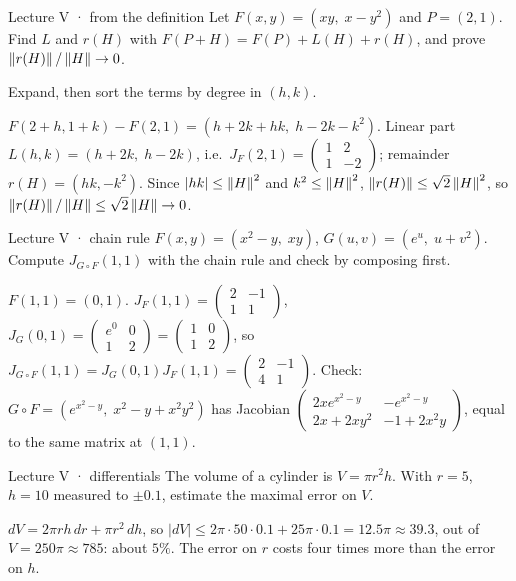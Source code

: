 \begin{problem}{Lecture V · from the definition}
Let $F(x,y)=(xy,\;x-y^2)$ and $P=(2,1)$. Find $L$ and $r(H)$ with $F(P+H)=F(P)+L(H)+r(H)$, and
prove $\left\lVert r(H)\right\rVert/\left\lVert H\right\rVert\to0$.
\end{problem}
\begin{hint}Expand, then sort the terms by degree in $(h,k)$.\end{hint}
\begin{solution}
$F(2+h,1+k)-F(2,1)=(h+2k+hk,\;h-2k-k^2)$. Linear part $L(h,k)=(h+2k,\;h-2k)$, i.e.\
$J_F(2,1)=\begin{pmatrix}1&2\\1&-2\end{pmatrix}$; remainder $r(H)=(hk,-k^2)$. Since $|hk|\le\left\lVert H\right\rVert^2$ and
$k^2\le\left\lVert H\right\rVert^2$, $\left\lVert r(H)\right\rVert\le\sqrt2\left\lVert H\right\rVert^2$, so $\left\lVert r(H)\right\rVert/\left\lVert H\right\rVert\le\sqrt2\left\lVert H\right\rVert\to0$.
\end{solution}

\begin{problem}{Lecture V · chain rule}
$F(x,y)=(x^2-y,\;xy)$, $G(u,v)=(e^u,\;u+v^2)$. Compute $J_{G\circ F}(1,1)$ with the chain rule and
check by composing first.
\end{problem}
\begin{solution}
$F(1,1)=(0,1)$. $J_F(1,1)=\begin{pmatrix}2&-1\\1&1\end{pmatrix}$, $J_G(0,1)=\begin{pmatrix}e^0&0\\1&2\end{pmatrix}=\begin{pmatrix}1&0\\1&2\end{pmatrix}$, so
$J_{G\circ F}(1,1)=J_G(0,1)J_F(1,1)=\begin{pmatrix}2&-1\\4&1\end{pmatrix}$.
Check: $G\circ F=(e^{x^2-y},\;x^2-y+x^2y^2)$ has Jacobian
$\begin{pmatrix}2xe^{x^2-y}&-e^{x^2-y}\\2x+2xy^2&-1+2x^2y\end{pmatrix}$, equal to the same matrix at $(1,1)$.
\end{solution}

\begin{problem}{Lecture V · differentials}
The volume of a cylinder is $V=\pi r^2h$. With $r=5$, $h=10$ measured to $\pm0.1$, estimate the
maximal error on $V$.
\end{problem}
\begin{solution}
$dV=2\pi rh\,dr+\pi r^2\,dh$, so $|dV|\le2\pi\cdot50\cdot0.1+25\pi\cdot0.1=12.5\pi\approx39.3$, out of
$V=250\pi\approx785$: about $5\%$. The error on $r$ costs four times more than the error on $h$.
\end{solution}

